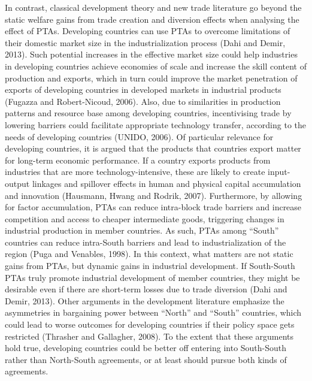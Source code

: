 In contrast, classical development theory and new trade literature go
beyond the static welfare gains from trade creation and diversion
effects when analysing the effect of PTAs. Developing countries can use
PTAs to overcome limitations of their domestic market size in the
industrialization process (Dahi and Demir, 2013). Such potential
increases in the effective market size could help industries in
developing countries achieve economies of scale and increase the skill
content of production and exports, which in turn could improve the
market penetration of exports of developing countries in developed
markets in industrial products (Fugazza and Robert-Nicoud, 2006). Also,
due to similarities in production patterns and resource base among
developing countries, incentivising trade by lowering barriers could
facilitate appropriate technology transfer, according to the needs of
developing countries (UNIDO, 2006). Of particular relevance for
developing countries, it is argued that the products that countries
export matter for long-term economic performance. If a country exports
products from industries that are more technology-intensive, these are
likely to create input-output linkages and spillover effects in human
and physical capital accumulation and innovation (Hausmann, Hwang and
Rodrik, 2007). Furthermore, by allowing for factor accumulation, PTAs
can reduce intra-block trade barriers and increase competition and
access to cheaper intermediate goods, triggering changes in industrial
production in member countries. As such, PTAs among ``South'' countries
can reduce intra-South barriers and lead to industrialization of the
region (Puga and Venables, 1998). In this context, what matters are not
static gains from PTAs, but dynamic gains in industrial development. If
South-South PTAs truly promote industrial development of member
countries, they might be desirable even if there are short-term losses
due to trade diversion (Dahi and Demir, 2013). Other arguments in the
development literature emphasize the asymmetries in bargaining power
between ``North'' and ``South'' countries, which could lead to worse
outcomes for developing countries if their policy space gets restricted
(Thrasher and Gallagher, 2008). To the extent that these arguments hold
true, developing countries could be better off entering into South-South
rather than North-South agreements, or at least should pursue both kinds
of agreements.